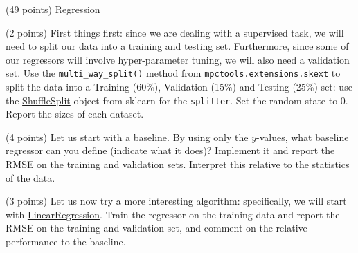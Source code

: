 \documentclass[12pt]{article}
\begin{document}
\begin{question}{\label{Q_LR_BA}(49 points) Regression}





\begin{subquestion}{(2 points) First things first: since we are dealing with a supervised task, we will need to split our data into a training and testing set. Furthermore, since some of our regressors will involve hyper-parameter tuning, we will also need a validation set. Use the \texttt{multi\_way\_split()} method from \texttt{mpctools.extensions.skext} to split the data into a Training (60\%), Validation (15\%) and Testing (25\%) set: use the \href{https://scikit-learn.org/stable/modules/generated/sklearn.model_selection.ShuffleSplit.html}{ShuffleSplit} object from sklearn for the \texttt{splitter}. Set the random state to 0.  Report the sizes of each dataset.}






\end{subquestion}

\begin{subquestion}{(4 points) Let us start with a baseline. By using only the $y$-values, what baseline regressor can you define (indicate what it does)? Implement it and report the RMSE on the training and validation sets. Interpret this relative to the statistics of the data.}






\end{subquestion}

\begin{subquestion}{(3 points) Let us now try a more interesting algorithm: specifically, we will start with \href{https://scikit-learn.org/stable/modules/generated/sklearn.linear_model.LinearRegression.html}{LinearRegression}. Train the regressor on the training data and report the RMSE on the training and validation set, and comment on the relative performance to the baseline.}




\end{subquestion}
\end{question}
\end{document}
